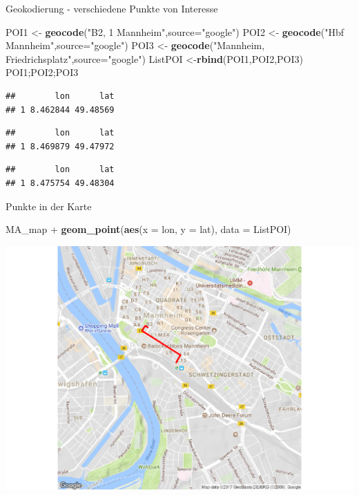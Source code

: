 \documentclass[ignorenonframetext,]{beamer}
\newenvironment{Shaded}{}{}
\newcommand{\KeywordTok}[1]{\textcolor[rgb]{0.00,0.44,0.13}{\textbf{{#1}}}}
\newcommand{\DataTypeTok}[1]{\textcolor[rgb]{0.56,0.13,0.00}{{#1}}}
\newcommand{\StringTok}[1]{\textcolor[rgb]{0.25,0.44,0.63}{{#1}}}
\newcommand{\NormalTok}[1]{{#1}}
\begin{document}
\begin{frame}[fragile]{Geokodierung - verschiedene Punkte von Interesse}

\begin{Shaded}
\begin{Highlighting}[]
\NormalTok{POI1 <-}\StringTok{ }\KeywordTok{geocode}\NormalTok{(}\StringTok{"B2, 1 Mannheim"}\NormalTok{,}\DataTypeTok{source=}\StringTok{"google"}\NormalTok{)}
\NormalTok{POI2 <-}\StringTok{ }\KeywordTok{geocode}\NormalTok{(}\StringTok{"Hbf Mannheim"}\NormalTok{,}\DataTypeTok{source=}\StringTok{"google"}\NormalTok{)}
\NormalTok{POI3 <-}\StringTok{ }\KeywordTok{geocode}\NormalTok{(}\StringTok{"Mannheim, Friedrichsplatz"}\NormalTok{,}\DataTypeTok{source=}\StringTok{"google"}\NormalTok{)}
\NormalTok{ListPOI <-}\KeywordTok{rbind}\NormalTok{(POI1,POI2,POI3)}
\NormalTok{POI1;POI2;POI3}
\end{Highlighting}
\end{Shaded}

\begin{verbatim}
##        lon      lat
## 1 8.462844 49.48569
\end{verbatim}

\begin{verbatim}
##        lon      lat
## 1 8.469879 49.47972
\end{verbatim}

\begin{verbatim}
##        lon      lat
## 1 8.475754 49.48304
\end{verbatim}

\end{frame}

\begin{frame}[fragile]{Punkte in der Karte}

\begin{Shaded}
\begin{Highlighting}[]
\NormalTok{MA_map +}
\KeywordTok{geom_point}\NormalTok{(}\KeywordTok{aes}\NormalTok{(}\DataTypeTok{x =} \NormalTok{lon, }\DataTypeTok{y =} \NormalTok{lat),}
\DataTypeTok{data =} \NormalTok{ListPOI)}
\end{Highlighting}
\end{Shaded}

\includegraphics{R_intern_files/figure-beamer/unnamed-chunk-285-1.pdf}

\end{frame}
\end{document}
